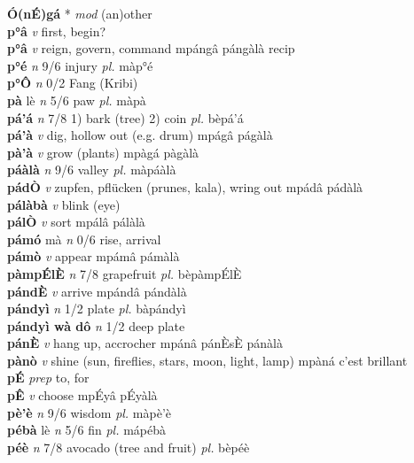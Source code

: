 \documentclass{article}
\begin{document}
{\bf Ó(nÉ)gá} * {\it mod} (an)other         \\ 
{\bf p°â}  {\it v} first, begin?         \\ 
{\bf p°â}  {\it v} reign, govern, command   mpángâ   pángàlà recip   \\ 
{\bf p°é}  {\it n} 9/6 injury {\it pl.} màp°é         \\ 
{\bf p°Ô}  {\it n} 0/2 Fang (Kribi)         \\ 
{\bf pà} lè {\it n} 5/6 paw {\it pl.} màpà         \\ 
{\bf pá'á}  {\it n} 7/8 1) bark (tree) 2) coin {\it pl.} bèpá'á         \\ 
{\bf pá'à}  {\it v} dig, hollow out (e.g. drum)   mpágâ   págàlà   \\ 
{\bf pà'à}  {\it v} grow (plants)   mpàgá   pàgàlà   \\ 
{\bf páàlà}  {\it n} 9/6 valley {\it pl.} màpáàlà         \\ 
{\bf pádÒ}  {\it v} zupfen, pflücken (prunes, kala), wring out   mpádâ   pádàlà   \\ 
{\bf pálàbà}  {\it v} blink (eye)         \\ 
{\bf pálÒ}  {\it v} sort   mpálâ   pálàlà   \\ 
{\bf pámó} mà {\it n} 0/6 rise, arrival         \\ 
{\bf pámò}  {\it v} appear   mpámâ   pámàlà   \\ 
{\bf pàmpÉlÈ}  {\it n} 7/8 grapefruit {\it pl.} bèpàmpÉlÈ         \\ 
{\bf pándÈ}  {\it v} arrive   mpándâ   pándàlà   \\ 
{\bf pándyì}  {\it n} 1/2 plate {\it pl.} bàpándyì         \\ 
{\bf pándyì wà dô}  {\it  n} 1/2 deep plate         \\ 
{\bf pánÈ}  {\it v} hang up, accrocher   mpánâ  pánÈsÈ pánàlà   \\ 
{\bf pànò}  {\it v} shine (sun, fireflies, stars, moon, light, lamp)   mpàná c'est brillant      \\ 
{\bf pÉ}  {\it prep} to, for         \\ 
{\bf pÊ}  {\it v} choose   mpÉyâ   pÉyàlà   \\ 
{\bf pè'è}   {\it n} 9/6 wisdom {\it pl.} màpè'è         \\ 
{\bf pébà} lè {\it n} 5/6 fin {\it pl.} mápébà         \\ 
{\bf péè}  {\it n} 7/8 avocado (tree and fruit) {\it pl.} bèpéè         \\ 
\end{document}
